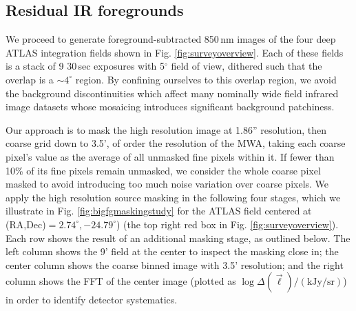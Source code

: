 \documentclass{emulateapj}
\begin{document}
\subsection{Residual IR foregrounds}
\label{sec:resirfg}

We proceed to generate foreground-subtracted 850\,nm images of the four deep ATLAS integration fields shown in Fig. \ref{fig:surveyoverview}. Each of these fields is a stack of 9 30\,sec exposures with 5$^\circ$ field of view, dithered such that the overlap is a $\sim4^\circ$ region. By confining ourselves to this overlap region, we avoid the background discontinuities which affect many nominally wide field infrared image datasets whose mosaicing introduces significant background patchiness. 

Our approach is to mask the high resolution image at 1.86'' resolution, then coarse grid down to 3.5', of order the resolution of the MWA, taking each coarse pixel's value as the average of all unmasked fine pixels within it. If fewer than 10\% of its fine pixels remain unmasked, we consider the whole coarse pixel masked to avoid introducing too much noise variation over coarse pixels. We apply the high resolution source masking in the following four stages, which we illustrate in Fig. \ref{fig:bigfgmaskingstudy} for the ATLAS field centered at (RA,Dec)$=2.74^\circ, -24.79^\circ$) (the top right red box in Fig. \ref{fig:surveyoverview}). Each row shows the result of an additional masking stage, as outlined below. The left column shows the 9' field at the center to inspect the masking close in; the center column shows the coarse binned image with 3.5' resolution; and the right column shows the FFT of the center image (plotted as $\log \Delta(\vec{\ell})/(\text{kJy/sr})$) in order to identify detector systematics. 
\end{document}
